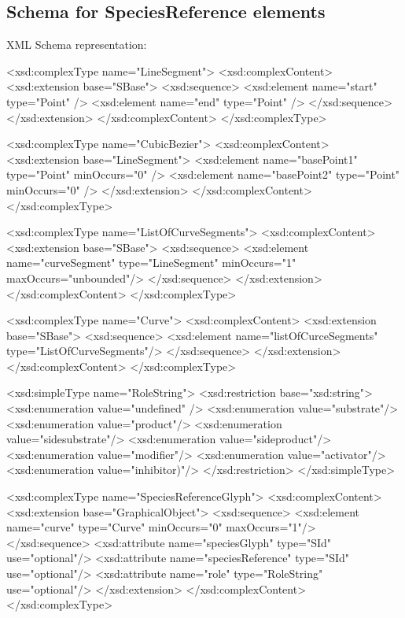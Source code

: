\subsection{Schema for SpeciesReference elements}

XML Schema representation:


\begin{example}

<xsd:complexType name="LineSegment">
  <xsd:complexContent>
    <xsd:extension base="SBase">
    <xsd:sequence>
        <xsd:element name="start" type="Point" />
        <xsd:element name="end" type="Point" />
    </xsd:sequence>
    </xsd:extension>
  </xsd:complexContent>
</xsd:complexType>

<xsd:complexType name="CubicBezier">
  <xsd:complexContent>
    <xsd:extension base="LineSegment">
        <xsd:element name="basePoint1" type="Point" minOccurs="0" />
        <xsd:element name="basePoint2" type="Point" minOccurs="0" />
    </xsd:extension>
  </xsd:complexContent>
</xsd:complexType>

<xsd:complexType name="ListOfCurveSegments">
  <xsd:complexContent>
    <xsd:extension base="SBase">
      <xsd:sequence>
        <xsd:element name="curveSegment" type="LineSegment" 
                          minOccurs="1" maxOccurs="unbounded"/>
      </xsd:sequence>
    </xsd:extension>
  </xsd:complexContent>
</xsd:complexType>

<xsd:complexType name="Curve">
  <xsd:complexContent>
    <xsd:extension base="SBase">
      <xsd:sequence>
        <xsd:element name="listOfCurceSegments" type="ListOfCurveSegments"/>
      </xsd:sequence>
    </xsd:extension>
  </xsd:complexContent>
</xsd:complexType>

<xsd:simpleType name="RoleString">
  <xsd:restriction base="xsd:string">
    <xsd:enumeration value="undefined" />
    <xsd:enumeration value="substrate"/>
    <xsd:enumeration value="product"/>
    <xsd:enumeration value="sidesubstrate"/>
    <xsd:enumeration value="sideproduct"/>
    <xsd:enumeration value="modifier"/>
    <xsd:enumeration value="activator"/>
    <xsd:enumeration value="inhibitor)"/>
  </xsd:restriction>
</xsd:simpleType>

<xsd:complexType name="SpeciesReferenceGlyph">
 <xsd:complexContent>
  <xsd:extension base="GraphicalObject">
   <xsd:sequence>
     <xsd:element name="curve" type="Curve" minOccurs="0" maxOccurs="1"/>
   </xsd:sequence>
   <xsd:attribute name="speciesGlyph" type="SId" use="optional"/>
   <xsd:attribute name="speciesReference" type="SId" use="optional"/>
   <xsd:attribute name="role" type="RoleString" use="optional"/>
  </xsd:extension>
 </xsd:complexContent>
</xsd:complexType>
\end{example}



